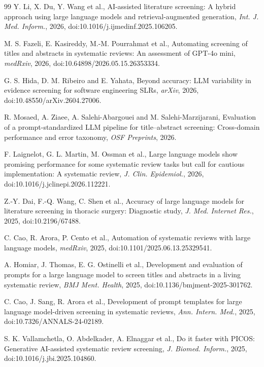 \documentclass[12pt,a4paper]{article}
\begin{document}
\begin{thebibliography}{99}
 Y. Li, X. Du, Y. Wang et al., AI-assisted literature screening: A hybrid approach
using large language models and retrieval-augmented generation, \textit{Int. J. Med. Inform.},
2026, doi:10.1016/j.ijmedinf.2025.106205.

 M. S. Fazeli, E. Kasireddy, M.-M. Pourrahmat et al., Automating screening of titles
and abstracts in systematic reviews: An assessment of GPT-4o mini, \textit{medRxiv}, 2026,
doi:10.64898/2026.05.15.26353334.

 G. S. Hida, D. M. Ribeiro and E. Yahata, Beyond accuracy: LLM variability in evidence
screening for software engineering SLRs, \textit{arXiv}, 2026, doi:10.48550/arXiv.2604.27006.

 R. Mosaed, A. Ziaee, A. Salehi-Abargouei and M. Salehi-Marzijarani, Evaluation of a
prompt-standardized LLM pipeline for title--abstract screening: Cross-domain performance and
error taxonomy, \textit{OSF Preprints}, 2026.

 F. Laignelot, G. L. Martin, M. Ossman et al., Large language models show promising
performance for some systematic review tasks but call for cautious implementation: A systematic
review, \textit{J. Clin. Epidemiol.}, 2026, doi:10.1016/j.jclinepi.2026.112221.

 Z.-Y. Dai, F.-Q. Wang, C. Shen et al., Accuracy of large language models for
literature screening in thoracic surgery: Diagnostic study, \textit{J. Med. Internet Res.}, 2025,
doi:10.2196/67488.

 C. Cao, R. Arora, P. Cento et al., Automation of systematic reviews with large
language models, \textit{medRxiv}, 2025, doi:10.1101/2025.06.13.25329541.

 A. Homiar, J. Thomas, E. G. Ostinelli et al., Development and evaluation of prompts
for a large language model to screen titles and abstracts in a living systematic review,
\textit{BMJ Ment. Health}, 2025, doi:10.1136/bmjment-2025-301762.

 C. Cao, J. Sang, R. Arora et al., Development of prompt templates for large language
model-driven screening in systematic reviews, \textit{Ann. Intern. Med.}, 2025,
doi:10.7326/ANNALS-24-02189.

 S. K. Vallamchetla, O. Abdelkader, A. Elnaggar et al., Do it faster with PICOS:
Generative AI-assisted systematic review screening, \textit{J. Biomed. Inform.}, 2025,
doi:10.1016/j.jbi.2025.104860.


\end{thebibliography}
\end{document}
